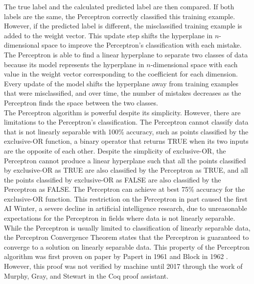 The true label and the calculated predicted label are then compared. If both labels are the same, the Perceptron correctly classified this training example. However, if the predicted label is different, the misclassified training example is added to the weight vector. This update step shifts the hyperplane in $n$-dimensional space to improve the Perceptron's classification with each mistake. The Perceptron is able to find a linear hyperplane to separate two classes of data because its model represents the hyperplane in $n$-dimensional space with each value in the weight vector corresponding to the coefficient for each dimension. Every update of the model shifts the hyperplane away from training examples that were misclassified, and over time, the number of mistakes decreases as the Perceptron finds the space between the two classes.
\\The Perceptron algorithm is powerful despite its simplicity. However, there are limitations to the Perceptron's classification. The Perceptron cannot classify data that is not linearly separable with 100\% accuracy, such as points classified by the exclusive-OR function, a binary operator that returns TRUE when its two inputs are the opposite of each other. Despite the simplicity of exclusive-OR, the Perceptron cannot produce a linear hyperplane such that all the points classified by exclusive-OR as TRUE are also classified by the Perceptron as TRUE, and all the points classified by exclusive-OR as FALSE are also classified by the Perceptron as FALSE. The Perceptron can achieve at best 75\% accuracy for the exclusive-OR function. This restriction on the Perceptron in part caused the first AI Winter, a severe decline in artificial intelligence research, due to unreasonable expectations for the Perceptron in fields where data is not linearly separable.
\\While the Perceptron is usually limited to classification of linearly separable data, the Perceptron Convergence Theorem states that the Perceptron is guaranteed to converge to a solution on linearly separable data. This property of the Perceptron algorithm was first proven on paper by Papert in 1961 \cite{Pap61} and Block in 1962 \cite{Blo62}. However, this proof was not verified by machine until 2017 through the work of Murphy, Gray, and Stewart \cite{MGS17} in the Coq proof assistant. 
